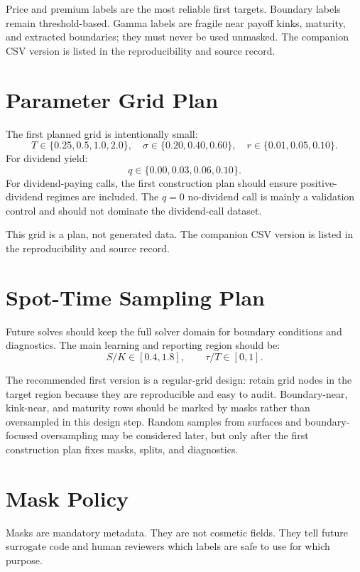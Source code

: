 \documentclass[11pt,a4paper]{article}
\begin{document}
Price and premium labels are the most reliable first targets. Boundary labels remain
threshold-based. Gamma labels are fragile near payoff kinks, maturity, and extracted boundaries;
they must never be used unmasked. The companion CSV version is listed in the reproducibility and
source record.

\section{Parameter Grid Plan}

The first planned grid is intentionally small:
\[
T \in \{0.25,0.5,1.0,2.0\},\quad
\sigma \in \{0.20,0.40,0.60\},\quad
r \in \{0.01,0.05,0.10\}.
\]
For dividend yield:
\[
q \in \{0.00,0.03,0.06,0.10\}.
\]
For dividend-paying calls, the first construction plan should ensure positive-dividend regimes
are included. The \(q=0\) no-dividend call is mainly a validation control and should not dominate
the dividend-call dataset.

This grid is a plan, not generated data. The companion CSV version is listed in the reproducibility
and source record.

\section{Spot-Time Sampling Plan}

Future solves should keep the full solver domain for boundary conditions and diagnostics. The
main learning and reporting region should be:
\[
S/K \in [0.4,1.8],\qquad \tau/T \in [0,1].
\]

The recommended first version is a regular-grid design: retain grid nodes in the target region
because they are reproducible and easy to audit. Boundary-near, kink-near, and maturity rows
should be marked by masks rather than oversampled in this design step. Random samples from
surfaces and boundary-focused oversampling may be considered later, but only after the first
construction plan fixes masks, splits, and diagnostics.

\section{Mask Policy}

Masks are mandatory metadata. They are not cosmetic fields. They tell future surrogate code and
human reviewers which labels are safe to use for which purpose.
\end{document}
